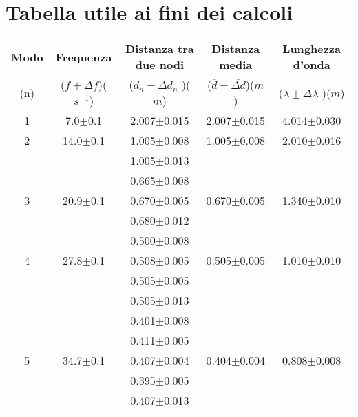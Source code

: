 \documentclass[12pt, a4paper]{article}
\begin{document}
\newpage

\section{Tabella utile ai fini dei calcoli}
{
\renewcommand\arraystretch{1.08} %
\begin{table}[h!] %
    \centering
    \begin{tabular}{|c|c|c|c|c|} %
    
    \hline %
    \textbf{Modo} & \textbf{Frequenza} & \textbf{Distanza tra due nodi} & \textbf{Distanza media} & \textbf{Lunghezza d'onda} \\ (n) & ($f\pm\Delta f$)($s^{-1}$) & ($d_n\pm\Delta d_n$ )($m$) & ($\overline{d}\pm\overline{\Delta{d}}$)($m$) & ($\lambda\pm\Delta\lambda$ )($m$) \\ [1ex] 
    
    \hline\hline %
1 & 7.0$\pm$0.1  & 2.007$\pm$0.015 & 2.007$\pm$0.015 & 4.014$\pm$0.030 \\ [0.7ex] %
    
    \hline %
2 & 14.0$\pm$0.1 & 1.005$\pm$0.008 & 1.005$\pm$0.008 & 2.010$\pm$0.016 \\ [0.7ex]
       &              & 1.005$\pm$0.013 &                 &            \\ [0.7ex]
    
    \hline
       &              & 0.665$\pm$0.008 &                 &            \\ [0.7ex]
3 & 20.9$\pm$0.1 & 0.670$\pm$0.005 & 0.670$\pm$0.005 & 1.340$\pm$0.010 \\ [0.7ex]
       &              & 0.680$\pm$0.012 &                 &            \\ [0.7ex]
    
    \hline 
       &              & 0.500$\pm$0.008 &                 &            \\ [0.7ex]
4 & 27.8$\pm$0.1 & 0.508$\pm$0.005 & 0.505$\pm$0.005 & 1.010$\pm$0.010 \\ [0.7ex]
       &              & 0.505$\pm$0.005 &                 &            \\ [0.7ex]
       &              & 0.505$\pm$0.013 &                 &            \\ [0.7ex]
   
    \hline %
       &              & 0.401$\pm$0.008 &                 &            \\ [0.7ex]
       &              & 0.411$\pm$0.005 &                 &            \\ [0.7ex]
5 & 34.7$\pm$0.1 & 0.407$\pm$0.004 & 0.404$\pm$0.004 & 0.808$\pm$0.008 \\ [0.7ex]
       &              & 0.395$\pm$0.005 &                 &            \\ [0.7ex]
       &              & 0.407$\pm$0.013 &                 &            \\ [0.7ex]
     

\end{tabular}
\end{table}}
\end{document}

